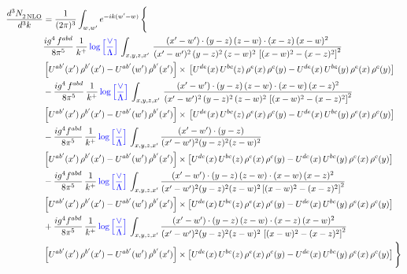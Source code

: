 \documentclass[9pt]{article}
\numberwithin{equation}{section}
\begin{document}
\begin{align}
   \frac{d^{3}N_{2\,\rm NLO}^{\rm}}{d^{3}k}  & = \frac{1}{(2\pi)^{3}}  \int_{w, w^\prime} e^{-ik(w^\prime-w)}\, \Bigg\{\notag \\ &  \frac{ig^{4}\, f^{abd}}{8\pi^{5}}\, \frac{1}{k^{+}}\,{\color{blue}\log{\left[\frac{\vee}{\Lambda}\right]}}\, \int_{x,y,z,x'}\,\frac{(x'-w')\cdot  (y-z)\, (z-w)\cdot (x-z)\, (x-w)^{2}}{(x'-w')^{2}\, (y-z)^{2}\, (z-w)^{2}\,\left[(x-w)^{2}-(x-z)^{2}\right]^{2}}\, \notag \\ & \left[U^{ab'}(x')\,\rho^{b'}(x')-U^{ab'}(w')\, \rho^{b'}(x')\right]\times\,\left[U^{de}(x)\,U^{bc}(z)\, \rho^{e}(x)\,\rho^{c}(y)-U^{de}(x)\,U^{bc}(y)\,\rho^{e}(x)\,\rho^{c}(y)\right]\notag \\ &   - \frac{ig^{4}\, f^{abd}}{8\pi^{5}}\, \frac{1}{k^{+}}\,{\color{blue}\log{\left[\frac{\vee}{\Lambda}\right]}}\, \int_{x,y,z,x'}\,\frac{(x'-w')\cdot  (y-z)\, (z-w)\cdot (x-w)\, (x-z)^{2}}{(x'-w')^{2}\, (y-z)^{2}\, (z-w)^{2}\,\left[(x-w)^{2}-(x-z)^{2}\right]^{2}}\, \notag \\ & \left[U^{ab'}(x')\,\rho^{b'}(x')-U^{ab'}(w')\, \rho^{b'}(x')\right]\times\,\left[U^{de}(x)\,U^{bc}(z)\, \rho^{e}(x)\,\rho^{c}(y)-U^{de}(x)\,U^{bc}(y)\,\rho^{e}(x)\,\rho^{c}(y)\right]\notag \\ & -\frac{ig^{4}f^{abd}}{8\pi^{5}}\,\frac{1}{k^{+}}\,{\color{blue}\log{\left[\frac{\vee}{\Lambda}\right]}}\,\int_{x,y,z,x'}
\frac{(x'-w')\cdot(y-z)}{(x'-w')^{2}(y-z)^{2}(z-w)^{2}}\notag \\ & \left[U^{ab'}(x')\,\rho^{b'}(x')-U^{ab'}(w')\, \rho^{b'}(x')\right]\times \left[U^{de}(x)\,U^{bc}(z)\, \rho^{e}(x)\,\rho^{c}(y)-U^{de}(x)\,U^{bc}(y)\,\rho^{e}(x)\,\rho^{c}(y)\right]\notag \\ & -\frac{ig^{4}f^{abd}}{8\pi^{5}}\,\frac{1}{k^{+}}\,{\color{blue}\log{\left[\frac{\vee}{\Lambda}\right]}}\,\int_{x,y,z,x'}
\frac{(x'-w')\cdot(y-z)\,(z-w)\cdot(x-w)\,(x-z)^{2}}{(x'-w')^{2}(y-z)^{2}(z-w)^{2}\left[(x-w)^{2}-(x-z)^{2}\right]^{2}}\notag \\ & \left[U^{ab'}(x')\,\rho^{b'}(x')-U^{ab'}(w')\, \rho^{b'}(x')\right]\times \left[U^{de}(x)\,U^{bc}(z)\, \rho^{e}(x)\,\rho^{c}(y)-U^{de}(x)\,U^{bc}(y)\,\rho^{e}(x)\,\rho^{c}(y)\right]\notag \\ & +\frac{ig^{4}f^{abd}}{8\pi^{5}}\,\frac{1}{k^{+}}\,{\color{blue}\log{\left[\frac{\vee}{\Lambda}\right]}}\,\int_{x,y,z,x'}
\frac{(x'-w')\cdot(y-z)\,(z-w)\cdot(x-z)\,(x-w)^{2}}{(x'-w')^{2}(y-z)^{2}(z-w)^{2}\,\left[(x-w)^{2}-(x-z)^{2}\right]^{2}}\notag \\ & \left[U^{ab'}(x')\,\rho^{b'}(x')-U^{ab'}(w')\, \rho^{b'}(x')\right]\times \left[U^{de}(x)\,U^{bc}(z)\, \rho^{e}(x)\,\rho^{c}(y)-U^{de}(x)\,U^{bc}(y)\,\rho^{e}(x)\,\rho^{c}(y)\right]\Bigg\} 
\end{align}   
\end{document}
